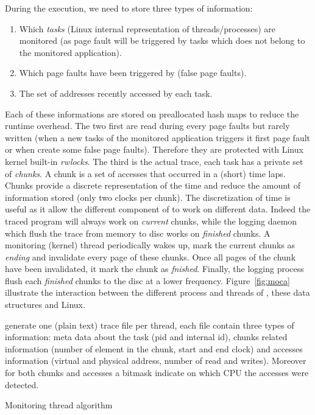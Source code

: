 During the execution, we need to store three types of information:
\begin{enumerate}
    \item Which \emph{tasks} (Linux internal representation of threads/processes) are
monitored (as page fault will be triggered by tasks which does not belong to
the monitored application).
    \item Which page faults have been triggered by \Moca (false page faults).
    \item The set of addresses recently accessed by each task.
\end{enumerate}

Each of these informations are stored on preallocated hash maps to reduce the
runtime overhead.  The two first are read during every page faults but rarely
written (when a new tasks of the monitored application triggers it first page
fault or when \Moca create some false page faults). Therefore they are
protected with Linux kernel built-in \emph{rwlocks}. The third is the actual
trace, each task has a private set of \emph{chunks}. A chunk is a set of
accesses that occurred in a (short) time laps.  Chunks provide a discrete
representation of the time and reduce the amount of information stored (only
two clocks per chunk). The discretization of time is useful as it allow the
different component of \Moca to work on different data.  Indeed the traced
program will always work on \emph{current} chunks, while the logging daemon
which flush the trace from memory to disc works on \emph{finished} chunks. A
monitoring (kernel) thread periodically wakes up, mark the current chunks as
\emph{ending} and invalidate every page of these chunks. Once all pages of the
chunk have been invalidated, it mark the chunk as \emph{fnished}. Finally, the
logging process flush each \emph{finished} chunks to the disc at a lower
frequency.  Figure~\ref{fig:moca} illustrate the interaction between the
different process and threads of \Moca, these data structures and Linux.

\Moca generate one (plain text) trace file per thread, each file contain three
types of information: meta data about the task (pid and \Moca internal id),
chunks related information (number of element in the chunk, start and end
clock) and accesses information (virtual and physical address, number of read
and writes). Moreover for both chunks and accesses a bitmask indicate on which
CPU the accesses were detected.

\begin{algorithm}[htb]
    \caption{Monitoring thread algorithm}
    \label{algo:monTh}
    \begin{algorithmic}[1]
        \State {}
                    \State {}
                    \State {}
                    \State {}
                \EndFor
            \EndFor
            \State {}
        \EndWhile
    \end{algorithmic}
\end{algorithm}

